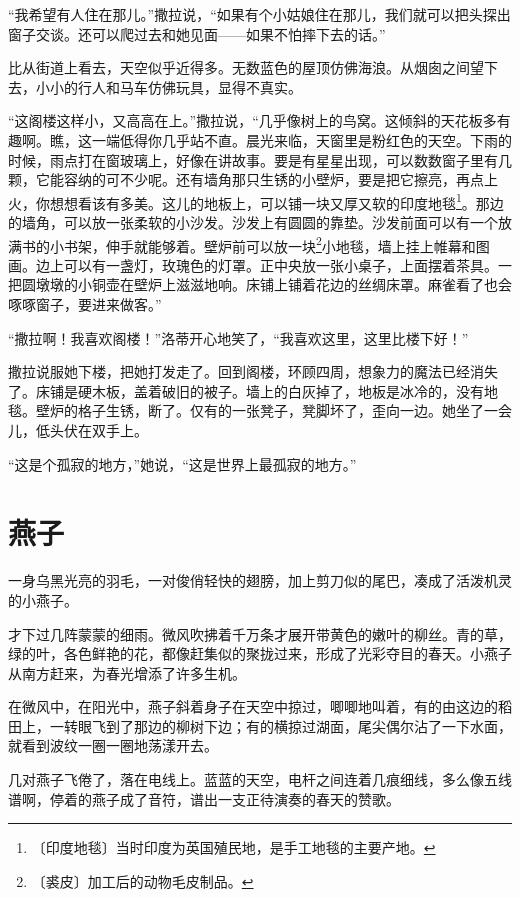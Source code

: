 \documentclass[12pt,UTF-8,openany]{ctexbook}
\begin{document}
\begin{large}
    “我希望有人住在那儿。”撒拉说，“如果有个小姑娘住在那儿，我们就可以把头探出窗子交谈。还可以爬过去和她见面——如果不怕摔下去的话。”
    
    比从街道上看去，天空似乎近得多。无数蓝色的屋顶仿佛海浪。从烟囱之间望下去，小小的行人和马车仿佛玩具，显得不真实。
    
    “这阁楼这样小，又高高在上。”撒拉说，“几乎像树上的鸟窝。这倾斜的天花板多有趣啊。瞧，这一端低得你几乎站不直。晨光来临，天窗里是粉红色的天空。下雨的时候，雨点打在窗玻璃上，好像在讲故事。要是有星星出现，可以数数窗子里有几颗，它能容纳的可不少呢。还有墙角那只生锈的小壁炉，要是把它擦亮，再点上火，你想想看该有多美。这儿的地板上，可以铺一块又厚又软的印度地毯\footnote{〔印度地毯〕当时印度为英国殖民地，是手工地毯的主要产地。}。那边的墙角，可以放一张柔软的小沙发。沙发上有圆圆的靠垫。沙发前面可以有一个放满书的小书架，伸手就能够着。壁炉前可以放一块\footnote{〔裘皮〕加工后的动物毛皮制品。}小地毯，墙上挂上帷幕和图画。边上可以有一盏灯，玫瑰色的灯罩。正中央放一张小桌子，上面摆着茶具。一把圆墩墩的小铜壶在壁炉上滋滋地响。床铺上铺着花边的丝绸床罩。麻雀看了也会啄啄窗子，要进来做客。”
    
    “撒拉啊！我喜欢阁楼！”洛蒂开心地笑了，“我喜欢这里，这里比楼下好！”
    
    撒拉说服她下楼，把她打发走了。回到阁楼，环顾四周，想象力的魔法已经消失了。床铺是硬木板，盖着破旧的被子。墙上的白灰掉了，地板是冰冷的，没有地毯。壁炉的格子生锈，断了。仅有的一张凳子，凳脚坏了，歪向一边。她坐了一会儿，低头伏在双手上。
    
    “这是个孤寂的地方，”她说，“这是世界上最孤寂的地方。”
    
\end{large}



\chapter{燕子}

\begin{large}
    
    一身乌黑光亮的羽毛，一对俊俏轻快的翅膀，加上剪刀似的尾巴，凑成了活泼机灵的小燕子。
    
    才下过几阵蒙蒙的细雨。微风吹拂着千万条才展开带黄色的嫩叶的柳丝。青的草，绿的叶，各色鲜艳的花，都像赶集似的聚拢过来，形成了光彩夺目的春天。小燕子从南方赶来，为春光增添了许多生机。
    
    在微风中，在阳光中，燕子斜着身子在天空中掠过，唧唧地叫着，有的由这边的稻田上，一转眼飞到了那边的柳树下边；有的横掠过湖面，尾尖偶尔沾了一下水面，就看到波纹一圈一圈地荡漾开去。
    
    几对燕子飞倦了，落在电线上。蓝蓝的天空，电杆之间连着几痕细线，多么像五线谱啊，停着的燕子成了音符，谱出一支正待演奏的春天的赞歌。
    
\end{large}
\end{document}
